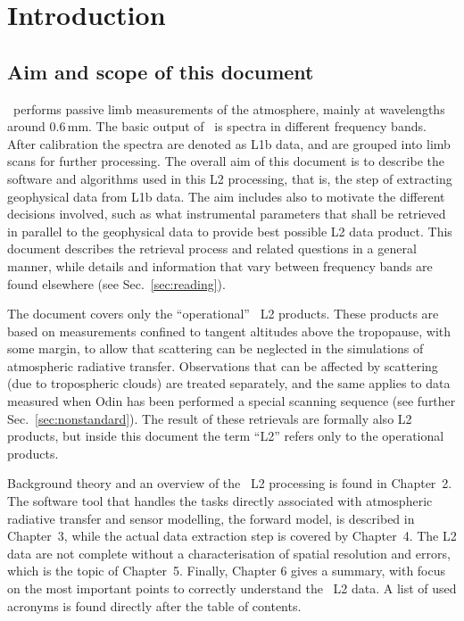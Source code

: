 \chapter{Introduction}
\label{chapter:introduction}

\setcounter{page}{1}


\section{Aim and scope of this document}
\label{sec:aim}
%
\smr\ performs passive limb measurements of the atmosphere, mainly at wavelengths
around 0.6\,mm. The basic output of \smr\ is spectra in different frequency
bands. After calibration the spectra are denoted as L1b data, and are grouped
into limb scans for further processing. The overall aim of this document is to
describe the software and algorithms used in this L2 processing, that is, the
step of extracting geophysical data from L1b data. The aim includes also to
motivate the different decisions involved, such as what instrumental parameters
that shall be retrieved in parallel to the geophysical data to provide best
possible L2 data product. This document describes the retrieval process and
related questions in a general manner, while details and information that
vary between frequency bands are found elsewhere (see
Sec.~\ref{sec:reading}).

The document covers only the ``operational'' \smr\ L2 products. These products
are based on measurements confined to tangent altitudes above the tropopause,
with some margin, to allow that scattering can be neglected in the simulations
of atmospheric radiative transfer. Observations that can be affected by
scattering (due to tropospheric clouds) are treated separately, and the same
applies to data measured when Odin has been performed a special scanning
sequence (see further Sec.~\ref{sec:nonstandard}). The result of these
retrievals are formally also L2 products, but inside this document the term
``L2'' refers only to the operational products.

Background theory and an overview of the \smr\ L2 processing is found in
Chapter~2. The software tool that handles the tasks directly associated with
atmospheric radiative transfer and sensor modelling, the forward model, is
described in Chapter~3, while the actual data extraction step is covered by
Chapter~4. The L2 data are not complete without a characterisation of
spatial resolution and errors, which is the topic of Chapter~5. Finally,
Chapter 6 gives a summary, with focus on the most important points to correctly
understand the \smr\ L2 data. A list of used acronyms is found directly after
the table of contents.




